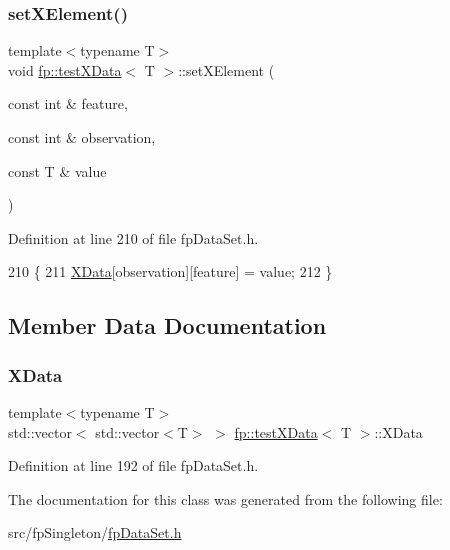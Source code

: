 \subsubsection{\texorpdfstring{set\+X\+Element()}{setXElement()}}
{\footnotesize\ttfamily template$<$typename T$>$ \\
void \hyperlink{classfp_1_1testXData}{fp\+::test\+X\+Data}$<$ T $>$\+::set\+X\+Element (\begin{DoxyParamCaption}\item[{const int \&}]{feature,  }\item[{const int \&}]{observation,  }\item[{const T \&}]{value }\end{DoxyParamCaption})\hspace{0.3cm}{\ttfamily [inline]}}



Definition at line 210 of file fp\+Data\+Set.\+h.


\begin{DoxyCode}
210                                                                                             \{
211             \hyperlink{classfp_1_1testXData_a3a7fe96fa4c950d66be4e9e8faa70e9c}{XData}[observation][feature] = value;
212         \}
\end{DoxyCode}


\subsection{Member Data Documentation}
\mbox{\label{classfp_1_1testXData_a3a7fe96fa4c950d66be4e9e8faa70e9c}} 
\subsubsection{\texorpdfstring{X\+Data}{XData}}
{\footnotesize\ttfamily template$<$typename T$>$ \\
std\+::vector$<$ std\+::vector$<$T$>$ $>$ \hyperlink{classfp_1_1testXData}{fp\+::test\+X\+Data}$<$ T $>$\+::X\+Data\hspace{0.3cm}{\ttfamily [private]}}



Definition at line 192 of file fp\+Data\+Set.\+h.



The documentation for this class was generated from the following file\+:\begin{DoxyCompactItemize}
\item 
src/fp\+Singleton/\hyperlink{fpDataSet_8h}{fp\+Data\+Set.\+h}\end{DoxyCompactItemize}

